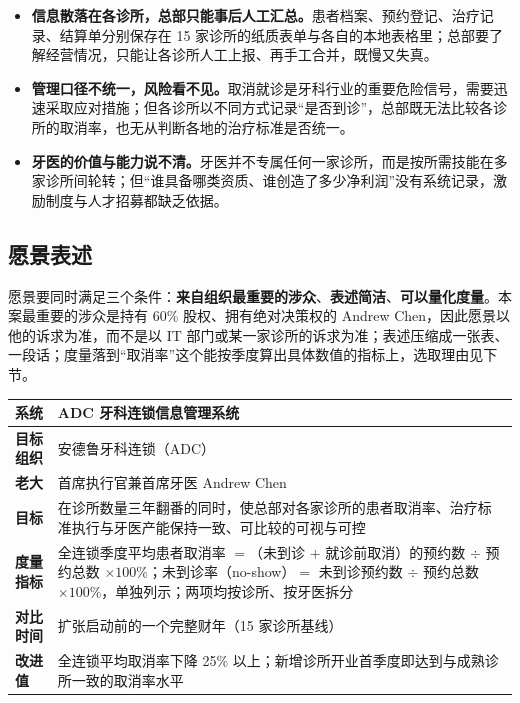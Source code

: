 \documentclass[11pt,a4paper]{ctexart}
\begin{document}
\begin{itemize}[leftmargin=1.6em,topsep=3pt,itemsep=2pt]
  \item \textbf{信息散落在各诊所，总部只能事后人工汇总。}患者档案、预约登记、治疗记录、结算单分别保存在 15 家诊所的纸质表单与各自的本地表格里；总部要了解经营情况，只能让各诊所人工上报、再手工合并，既慢又失真。
  \item \textbf{管理口径不统一，风险看不见。}取消就诊是牙科行业的重要危险信号，需要迅速采取应对措施；但各诊所以不同方式记录“是否到诊”，总部既无法比较各诊所的取消率，也无从判断各地的治疗标准是否统一。
  \item \textbf{牙医的价值与能力说不清。}牙医并不专属任何一家诊所，而是按所需技能在多家诊所间轮转；但“谁具备哪类资质、谁创造了多少净利润”没有系统记录，激励制度与人才招募都缺乏依据。
\end{itemize}

\subsection{愿景表述}

愿景要同时满足三个条件：\textbf{来自组织最重要的涉众}、\textbf{表述简洁}、\textbf{可以量化度量}。本案最重要的涉众是持有 60\% 股权、拥有绝对决策权的 Andrew Chen，因此愿景以他的诉求为准，而不是以 IT 部门或某一家诊所的诉求为准；表述压缩成一张表、一段话；度量落到“取消率”这个能按季度算出具体数值的指标上，选取理由见下节。

\begin{tcolorbox}[colback=adclight!45,colframe=adcblue!75,boxrule=0.6pt,arc=2pt,left=8pt,right=8pt,top=7pt,bottom=7pt,
  title={\bfseries 目标系统愿景},fonttitle=\bfseries\color{white},colbacktitle=adcblue!85]
\begin{tabularx}{\linewidth}{@{}|L{2.4cm}|X|@{}}
\hline
\textbf{系统} & ADC 牙科连锁信息管理系统 \\
\hline
\textbf{目标组织} & 安德鲁牙科连锁（ADC） \\
\hline
\textbf{老大} & 首席执行官兼首席牙医 Andrew Chen \\
\hline
\textbf{目标} & 在诊所数量三年翻番的同时，使总部对各家诊所的患者取消率、治疗标准执行与牙医产能保持一致、可比较的可视与可控 \\
\hline
\textbf{度量指标} & 全连锁季度平均患者取消率 $=$（未到诊 $+$ 就诊前取消）的预约数 $\div$ 预约总数 $\times 100\%$；未到诊率（no-show）$=$ 未到诊预约数 $\div$ 预约总数 $\times 100\%$，单独列示；两项均按诊所、按牙医拆分 \\
\hline
\textbf{对比时间} & 扩张启动前的一个完整财年（15 家诊所基线） \\
\hline
\textbf{改进值} & 全连锁平均取消率下降 25\% 以上；新增诊所开业首季度即达到与成熟诊所一致的取消率水平 \\
\hline
\end{tabularx}
\end{tcolorbox}
\end{document}
